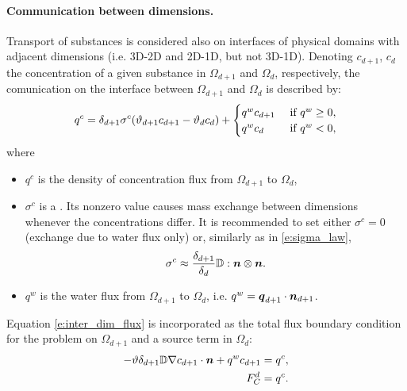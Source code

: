 \paragraph{Communication between dimensions.}
Transport of substances is considered also on interfaces of physical domains with adjacent dimensions (i.e. 3D-2D and 2D-1D, but not 3D-1D).
Denoting $c_{d+1}$, $c_d$ the concentration of a given substance in $\Omega_{d+1}$ and $\Omega_d$, respectively, the comunication on the interface between $\Omega_{d+1}$ and $\Omega_d$ is described by:
\begin{equation}
  \label{e:inter_dim_flux}
  q^c = \delta_{d+1}\sigma^c (\th_{d+1} c_{d+1} - \th_d c_d) + \begin{cases}q^w c_{d+1} & \mbox{ if }q^w\ge 0,\\q^w c_d & \mbox{ if }q^w<0,\end{cases}
\end{equation}
where
\begin{itemize}
\item $q^c$  is the density of concentration flux from $\Omega_{d+1}$ to $\Omega_d$,
\item $\sigma^c$  is a .
Its nonzero value causes mass exchange between dimensions whenever the concentrations differ.
It is recommended to set either $\sigma^c=0$ (exchange due to water flux only) or, similarly as in \eqref{e:sigma_law},
\[
  \sigma^c \approx\frac{\delta_{d+1}}{\delta_d}{{\mathbb{D}}}:\mathbf{\boldsymbol{n}}\otimes\mathbf{\boldsymbol{n}}.
\]
\item $q^w$  is the water flux from $\Omega_{d+1}$ to $\Omega_d$, i.e. $q^w = \mathbf{\boldsymbol{q}}_{d+1}\cdot\mathbf{\boldsymbol{n}}_{d+1}$.
\end{itemize}
Equation \eqref{e:inter_dim_flux} is incorporated as the total flux boundary condition for the problem on $\Omega_{d+1}$ and a source term in $\Omega_d$:
\begin{align}
-\th\delta_{d+1}\D\nabla c_{d+1}\cdot\vc n + q^w c_{d+1} &= q^c,\\
\label{e:FC}
F_C^d &= q^c.
\end{align}

